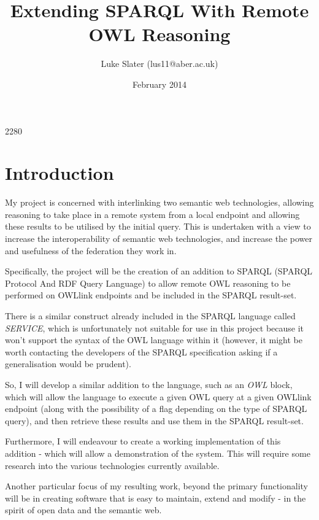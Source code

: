 \documentclass{article}
\begin{document}
\setlength{\parskip}{\medskipamount}
\setlength{\parindent}{0pt}

\title{Extending SPARQL With Remote OWL Reasoning}
\author{Luke Slater (lus11@aber.ac.uk)}
\date{February 2014}

\maketitle

\pagebreak

2280

\section{Introduction}

My project is concerned with interlinking two semantic web technologies,
allowing reasoning to take place in a remote system from a local endpoint and
allowing these results to be utilised by the initial query. This is undertaken
with a view to increase the interoperability of semantic web technologies, and
increase the power and usefulness of the federation they work in.

Specifically, the project will be the creation of an addition to
SPARQL\cite{sparql} (SPARQL Protocol And RDF Query Language) to allow remote
OWL\cite{owlprimer} reasoning to be performed on OWLlink endpoints and be included in the
SPARQL result-set.

There is a similar construct already included in the SPARQL language called
\emph{SERVICE}, which is unfortunately not suitable for use in this project
because it won't support the syntax of the OWL language within it (however, it
might be worth contacting the developers of the SPARQL specification asking if a
generalisation would be prudent).

So, I will develop a similar addition to the language, such as an \emph{OWL}
block, which will allow the language to execute a given OWL query at a given
OWLlink endpoint (along with the possibility of a flag depending on the type of
SPARQL query), and then retrieve these results and use them in the SPARQL
result-set.

Furthermore, I will endeavour to create a working implementation of this
addition - which will allow a demonstration of the system. This will require
some research into the various technologies currently available.

Another particular focus of my resulting work, beyond the primary functionality
will be in creating software that is easy to maintain, extend and modify - in
the spirit of open data and the semantic web.
\end{document}
